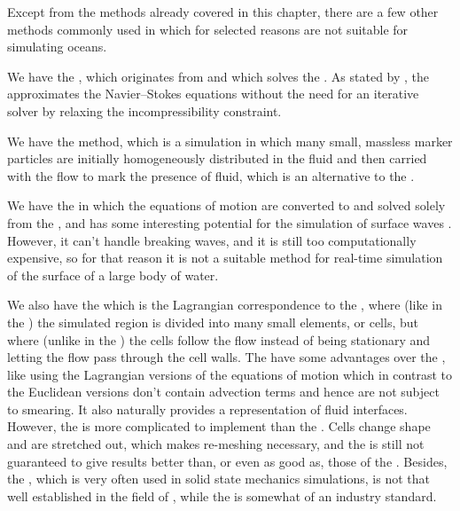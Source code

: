 Except from the methods already covered in this chapter, there are a few other methods commonly used in \CFD which for selected reasons are not suitable for simulating oceans.

We have the \LBM, which originates from  and which solves the . As stated by \citet{Thurey2006}, the \LBM approximates the Navier--Stokes equations without the need for an iterative solver by relaxing the incompressibility constraint.

We have the \MAC method, which is a \FVM simulation in which many small, massless marker particles are initially homogeneously distributed in the fluid and then carried with the flow to mark the presence of fluid, which is an alternative to the .

We have the \BEM in which the equations of motion are converted to  and solved solely from the \boundaries, and has some interesting potential for the simulation of surface waves \citep{Grilli2009}. However, it can't handle breaking waves, and it is still too computationally expensive, so for that reason it is not a suitable method for real-time simulation of the surface of a large body of water.

We also have the \FEM which is the Lagrangian correspondence to the \FVM, where (like in the \FVM) the simulated region is divided into many small elements, or cells, but where (unlike in the \FVM) the cells follow the flow instead of being stationary and letting the flow pass through the cell walls. The \FEM have some advantages over the \FVM, like using the Lagrangian versions of the equations of motion which in contrast to the Euclidean versions don't contain advection terms and hence are not subject to smearing. It also naturally provides a representation of fluid interfaces. However, the \FEM is more complicated to implement than the \FVM. Cells change shape and are stretched out, which makes re-meshing necessary, and the \FEM is still not guaranteed to give results better than, or even as good as, those of the \FVM. Besides, the \FEM, which is very often used in solid state mechanics simulations, is not that well established in the field of \CFD, while the \FVM is somewhat of an industry standard.